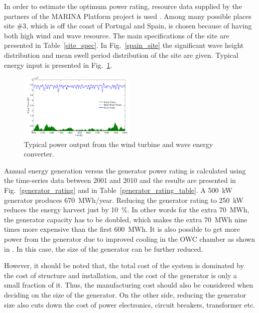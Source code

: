 \documentclass[twocolumn]{article}
\begin{document}
In order to estimate the optimum power rating, resource data supplied by the partners of the MARINA Platform project is used \cite{Gao2012}. Among many possible places site \#3, which is off the coast of Portugal and Spain, is chosen because of having both high wind and wave resource. The main specifications of the site are presented in Table~\ref{site_spec}. In Fig.~\ref{spain_site} the significant wave height distribution and mean swell period distribution of the site are given. Typical energy input is presented in Fig.~\ref{power_input}.




  \begin{figure}[]
    \centering
    \includegraphics[width=0.5\textwidth]{power_input}
    \caption{Typical power output from the wind turbine and wave energy converter.} 
    \label{power_input}
  \end{figure}

Annual energy generation versus the generator power rating is calculated using the time-series data between 2001 and 2010 and the results are presented in Fig.~\ref{generator_rating} and in Table~\ref{generator_rating_table}. A 500~kW generator produces 670~MWh/year. Reducing the generator rating to 250~kW reduces the energy harvest just by 10~\%. In other words for the extra 70~MWh, the generator capacity has to be doubled, which makes the extra 70~MWh nine times more expensive than the first 600~MWh. It is also possible to get more power from the generator due to improved cooling in the OWC chamber as shown in \cite{Hodgins2010a}. In this case, the size of the generator can be further reduced. 

However, it should be noted that, the total cost of the system is dominated by the cost of structure and installation, and the cost of the generator is only a small fraction of it. Thus, the manufacturing cost should also be considered when deciding on the size of the generator. On the other side, reducing the generator size also cuts down the cost of power electronics, circuit breakers, transformer etc.
\end{document}

